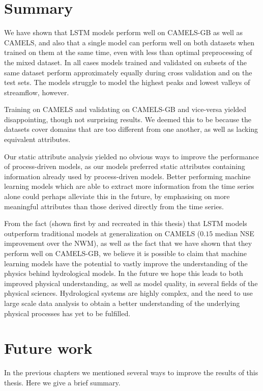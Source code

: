 \section{Summary}
We have shown that LSTM models perform well on CAMELS-GB as well as CAMELS, and 
also that a single model can perform well on both datasets when trained on them at the same time, even 
with less than optimal preprocessing of the mixed dataset.
In all cases models trained and validated on subsets of the same dataset perform 
approximately equally during cross validation and on the test sets. 
The models struggle to model the highest peaks and lowest valleys of streamflow, 
however. 

Training on CAMELS and validating on CAMELS-GB and vice-versa yielded disappointing, 
though not surprising results. We deemed this to be because the datasets cover 
domains that are too different from one another, as well as lacking equivalent 
attributes.

Our static attribute analysis yielded no obvious ways to improve the performance 
of process-driven models, as our models preferred static attributes containing 
information already used by process-driven models. Better performing 
machine learning models which are able to extract more information from the time 
series alone could perhaps alleviate this in the future, by emphasising on more 
meaningful attributes than those derived directly from the time series. 

From the fact (shown first by \citet{lstm_third_paper} and recreated in this thesis) 
that LSTM models outperform traditional models at generalization on 
CAMELS ($0.15$ median NSE improvement over the NWM), as well as the fact that we 
have shown that they perform well on CAMELS-GB, 
we believe it is possible to claim that machine learning models have the potential 
to vastly improve the understanding of the physics behind hydrological models. 
In the future we hope this leads to both improved physical understanding, 
as well as model quality, in several fields of the physical sciences. Hydrological 
systems are highly complex, and the need to use large scale data analysis to 
obtain a better understanding of the underlying physical processes has yet to be 
fulfilled. 

\section{Future work}
In the previous chapters we mentioned several ways to improve the results of this 
thesis. Here we give a brief summary.

